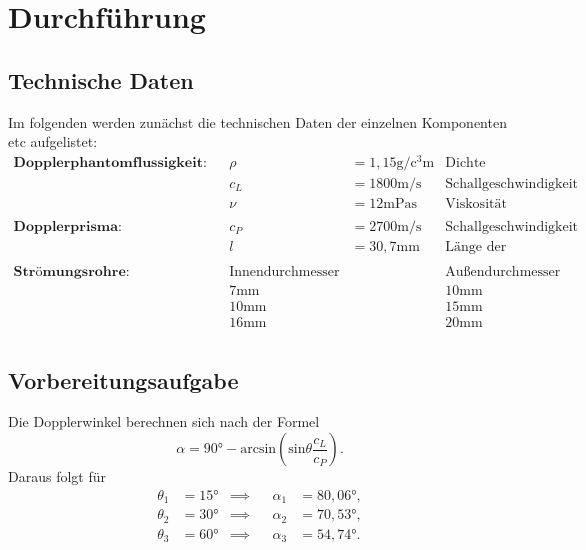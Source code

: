 \section{Durchführung}
\label{sec:Durchführung}
\subsection{Technische Daten} \label{sec:Daten}
Im folgenden werden zunächst die technischen Daten der einzelnen Komponenten etc aufgelistet:
\begin{align*}
    \textbf{Dopplerphantomflussigkeit:} && \rho &= 1,15  \unit\gram / \unit{\cubic\centi\meter} & \text{Dichte} \\
    && c_L &= 1800 \unit\meter / \unit\second & \text{Schallgeschwindigkeit} \\
    && \nu &= 12 \unit{\milli\pascal\second} & \text{Viskosität} \\
    \\
    \textbf{Dopplerprisma:} && c_P &= 2700 \unit\meter / \unit\second & \text{Schallgeschwindigkeit} \\
    && l &= 30,7 \unit{\milli\meter} & \text{Länge der Vorlaufstrecke} \\
    \\
    \textbf{Strömungsrohre:} && \text{Innendurchmesser} && \text{Außendurchmesser} \\
    && 7 \unit{\milli\meter} && 10 \unit{\milli\meter} \\
    && 10 \unit{\milli\meter} && 15 \unit{\milli\meter} \\
    && 16 \unit{\milli\meter} && 20 \unit{\milli\meter} \\
\end{align*}

\subsection{Vorbereitungsaufgabe}
Die Dopplerwinkel berechnen sich nach der Formel
\begin{equation}
    \alpha = 90° - \text{arcsin}\left(\text{sin} \theta \frac{c_L}{c_P}\right).
\end{equation}
Daraus folgt für
\begin{align*}
    \theta_1 &= 15° &\implies&& \alpha_1 &= 80,06°, \\
    \theta_2 &= 30° &\implies&& \alpha_2 &= 70,53°, \\
    \theta_3 &= 60° &\implies&& \alpha_3 &= 54,74°. \\
\end{align*}
